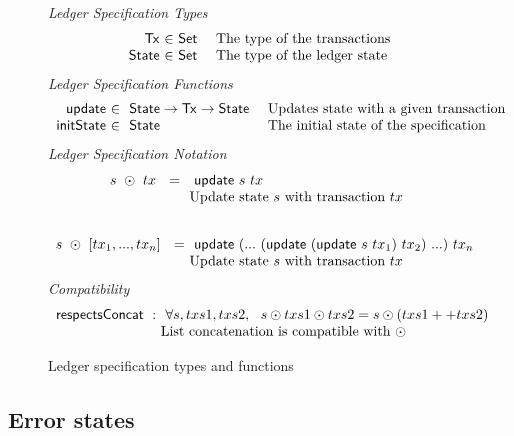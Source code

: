\begin{figure*}[htb]
  \emph{Ledger Specification Types}
  \begin{equation*}
    \begin{array}{r@{~\in~}l@{~~~~}lr}
      \Tx
      & \Set
      & \text{The type of the transactions} \\
      \State
      & \Set
      & \text{The type of the ledger state} \\
    \end{array}
  \end{equation*}
  \emph{Ledger Specification Functions}
  \begin{equation*}
    \begin{array}{r@{~\in~}l@{~~~~}lr}
    \ups & ~\type{State} \to \type{Tx} \to \type{State}
    & \text{Updates state with a given transaction} \\
    \fun{initState} & ~\type{State}
    & \text{The initial state of the specification} \\
    \end{array}
  \end{equation*}
  \emph{Ledger Specification Notation}
  \begin{equation*}
    \begin{array}{r@{~}l@{~~~~}lr}
    s~\odot~tx~ ~=~&~ \ups~s~tx  \\
    & \text{Update state $s$ with transaction $tx$} \\
    \nextdef
    s~\odot~[tx_1, ... , tx_n]~~= &~ \ups~(...~ (\ups~(\ups~s~tx_1)~tx_2) ~...)~ tx_n \\
    & \text{Update state $s$ with transaction $tx$} \\
    \end{array}
  \end{equation*}
  \emph{Compatibility}
  \begin{equation*}
    \begin{array}{r@{}l@{~~~~}lr}
    \fun{respectsConcat}~:~&~ \forall s, txs1, txs2,~~s \odot txs1 \odot txs2 = s \odot (txs1 ++ txs2)  \\
    & \text{List concatenation is compatible with $\odot$} \\
    \end{array}
  \end{equation*}
  \caption{Ledger specification types and functions}
  \label{fig:ledger-spec}
\end{figure*}

\subsection{Error states}
\label{sec:errors}

